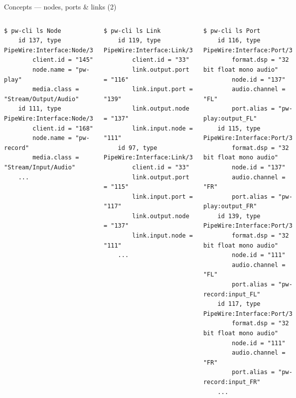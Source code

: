 \begin{frame}[fragile]{Concepts — nodes, ports \& links (2)}

  \begin{columns}

      \begin{block}{}
        \fontsize{7}{7}\selectfont
          \begin{verbatim}
$ pw-cli ls Node
    id 137, type PipeWire:Interface:Node/3
        client.id = "145"
        node.name = "pw-play"
        media.class = "Stream/Output/Audio"
    id 111, type PipeWire:Interface:Node/3
        client.id = "168"
        node.name = "pw-record"
        media.class = "Stream/Input/Audio"
    ...
          \end{verbatim}
        \end{block}

      \begin{block}{}
        \fontsize{7}{7}\selectfont
          \begin{verbatim}
$ pw-cli ls Link
    id 119, type PipeWire:Interface:Link/3
        client.id = "33"
        link.output.port = "116"
        link.input.port = "139"
        link.output.node = "137"
        link.input.node = "111"
    id 97, type PipeWire:Interface:Link/3
        client.id = "33"
        link.output.port = "115"
        link.input.port = "117"
        link.output.node = "137"
        link.input.node = "111"
    ...
          \end{verbatim}
        \end{block}


      \begin{block}{}
        \fontsize{7}{7}\selectfont
          \begin{verbatim}
$ pw-cli ls Port
    id 116, type PipeWire:Interface:Port/3
        format.dsp = "32 bit float mono audio"
        node.id = "137"
        audio.channel = "FL"
        port.alias = "pw-play:output_FL"
    id 115, type PipeWire:Interface:Port/3
        format.dsp = "32 bit float mono audio"
        node.id = "137"
        audio.channel = "FR"
        port.alias = "pw-play:output_FR"
    id 139, type PipeWire:Interface:Port/3
        format.dsp = "32 bit float mono audio"
        node.id = "111"
        audio.channel = "FL"
        port.alias = "pw-record:input_FL"
    id 117, type PipeWire:Interface:Port/3
        format.dsp = "32 bit float mono audio"
        node.id = "111"
        audio.channel = "FR"
        port.alias = "pw-record:input_FR"
    ...
          \end{verbatim}
        \end{block}

  \end{columns}
\end{frame}



